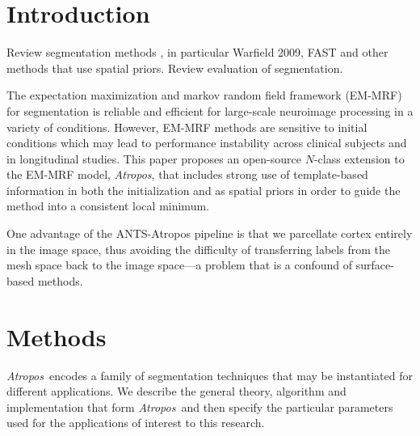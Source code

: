 \documentclass[preprint,authoryear,12pt]{elsarticle}
\newcommand {\alg}{{\em Atropos}}
\begin{document}
\section{Introduction}
Review segmentation methods , in particular Warfield 2009, FAST and
other methods that use spatial priors.  Review evaluation of
segmentation.

The expectation maximization and markov random field framework
(EM-MRF) for segmentation is reliable and efficient for large-scale
neuroimage processing in a variety of conditions.  However, EM-MRF
methods are sensitive to initial conditions which may lead to
performance instability across clinical subjects and in longitudinal
studies.  This paper proposes an open-source $N$-class extension to
the EM-MRF model, \alg, that includes strong use of template-based
information in both the initialization and as spatial priors in order
to guide the method into a consistent local minimum.

\begin{comment}{
  We evaluate this
method on BrainWeb 20 data and show that by relying upon accurate,
high-resolution diffeomorphic image registration, \alg~is capable of
reliably segmenting the BW20 whole head data into separate tissue
classes for muscle, skin, skull and bone marrow as well as the
standard three tissues, cerebrospinal fluid and gray and white matter.
\alg's three-tissue performance compares favorably with the standard
EM-MRF algorithm, FAST.  We also use the OASIS dataset to show that
\alg~increases segmentation repeatability relative to FAST.  The
evaluation data, the data-derived templates, the code and application
itself are publicly available.
}
\end{comment}

One advantage of the ANTS-Atropos pipeline is that we parcellate
cortex entirely in the image space, thus avoiding the difficulty of
transferring labels from the mesh space back to the image space---a
problem that is a confound of surface-based methods\cite{Klein2010}.


\section{Methods} \alg~encodes a family of segmentation techniques
that may be instantiated for different applications.  We describe the
general theory, algorithm and implementation that form \alg~and then
specify the particular parameters used for the applications of
interest to this research.
\end{document}
